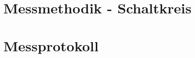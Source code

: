 


\section{Messmethodik - Schaltkreis}\label{sec:Messmethodik_Schaltkreis}


\section{Messprotokoll}\label{sec:Messprotokoll}






